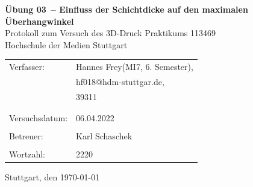 \documentclass[a4paper,12pt,bibtotocnumbered]{scrartcl}
\makeatletter
\numberwithin{equation}{section} %
\newcommand{\VERSUCHSDATUM}{06.04.2022}
\newcommand{\PROTOKOLLDATUM}{\today}
\newcommand{\VerfasserEINS}{Hannes Frey}
\newcommand{\MatNoEINS}{39311}
\newcommand{\StudiengangEINS}{MI7}
\newcommand{\SemesterEINS}{6. Semester}
\newcommand{\MailEINS}{hf018@hdm-stuttgar.de}
\newcommand{\VerfasserZWEI}{Verfasser 2}
\newcommand{\MatNoZWEI}{Matrikelnummer 2}
\newcommand{\StudiengangZWEI}{Technologiemanagement}
\newcommand{\BETREUER}{Karl Schaschek}
\newcommand{\WORTZAHL}{2220}
\newcommand{\GRUPPENNR}{Z-999}
\newcommand{\VERSUCHSNR}{Übung 03}
\newcommand{\VERSUCHSNAME}{Einfluss der Schichtdicke auf den maximalen Überhangwinkel}
\makeatother
\begin{document}
\thispagestyle{empty}


\begin{titlepage}

\begin{center}
\Huge{\textbf{\VERSUCHSNR\ – \VERSUCHSNAME}}\\%
\vspace{10mm}%
\Large{Protokoll zum Versuch des 3D-Druck Praktikums 113469  %
}\\
\vspace{10mm} 
\Large{Hochschule der Medien Stuttgart}\\
\end{center}
\vspace{1cm}
\begin{center}
\begin{tabular}{ll}
\large{Verfasser:}		& \large{\VerfasserEINS\;(\StudiengangEINS, \SemesterEINS),} \\ 
						& \large{\MailEINS}, \\
 						& \large{\MatNoEINS} \\
						\vspace{0cm}\\
\vspace{0cm}\\
\large{Versuchsdatum:}	& \large{\VERSUCHSDATUM} \\
\vspace{0cm}\\
\large{Betreuer:}		& \large{\BETREUER} \\
\vspace{0cm}\\
\large{Wortzahl:}		& \large{\WORTZAHL}
\end{tabular}
\end{center}
\vspace{65mm}

\begin{center}
Stuttgart, den \PROTOKOLLDATUM
\end{center}

\end{titlepage}
\end{document}
